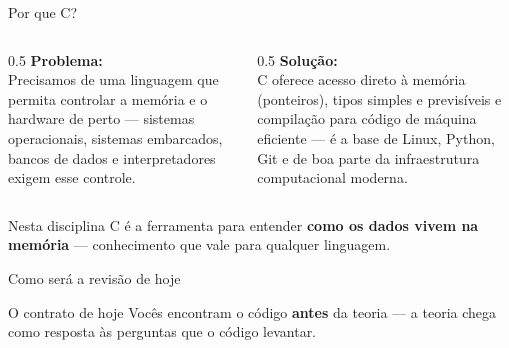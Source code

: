 \documentclass[aspectratio=169]{beamer}
\begin{document}
\begin{frame}{Por que C?}
  \begin{columns}[T]
    \begin{column}{0.5\textwidth}
      \textbf{Problema:}\\[2mm]
      Precisamos de uma linguagem que permita controlar a memória e o
      hardware de perto --- sistemas operacionais, sistemas embarcados,
      bancos de dados e interpretadores exigem esse controle.
    \end{column}
    \begin{column}{0.5\textwidth}
      \textbf{Solução:}\\[2mm]
      C oferece acesso direto à memória (ponteiros), tipos simples e
      previsíveis e compilação para código de máquina eficiente ---
      é a base de Linux, Python, Git e de boa parte da infraestrutura
      computacional moderna.
    \end{column}
  \end{columns}
  \begin{block}{Nesta disciplina}
    C é a ferramenta para entender \textbf{como os dados vivem na memória} ---
    conhecimento que vale para qualquer linguagem.
  \end{block}
\end{frame}

\begin{frame}{Como será a revisão de hoje}
  \begin{center}
  \end{center}
  \begin{block}{O contrato de hoje}
    Vocês encontram o código \textbf{antes} da teoria --- a teoria chega como
    resposta às perguntas que o código levantar.
  \end{block}
\end{frame}
\end{document}
